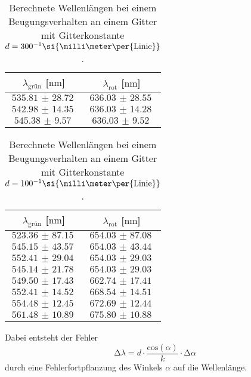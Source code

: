 \begin{table}
    \centering
    \caption{Berechnete Wellenlängen bei einem Beugungsverhalten an einem Gitter mit Gitterkonstante $\protect d = {300^{-1}}\si{\milli\meter\per{\text{Linie}}}$.}
    \label{tab:wave300}
    \begin{tabular}{c c}
        \toprule
        $\lambda_{\text{grün}}$ [$\si{\nano\meter}$] & $\lambda_{\text{rot}}$ [$\si{\nano\meter}$] \\
        \midrule
        $\SI{535.81(2872)}{}$ & $\SI{636.03(2855)}{}$ \\
        $\SI{542.98(1435)}{}$ & $\SI{636.03(1428)}{}$ \\
        $\SI{545.38(957)}{}$ & $\SI{636.03(952)}{}$  \\
        \bottomrule    
    \end{tabular}
\end{table}
\begin{table}
    \centering
    \caption{Berechnete Wellenlängen bei einem Beugungsverhalten an einem Gitter mit Gitterkonstante $\protect d = {100^{-1}}\si{\milli\meter\per{\text{Linie}}}$.}
    \label{tab:wave100}
    \begin{tabular}{c c}
        \toprule
        $\lambda_{\text{grün}}$ [$\si{\nano\meter}$] & $\lambda_{\text{rot}}$ [$\si{\nano\meter}$] \\
        \midrule
        $\SI{523.36(8715)}{}$ & $\SI{654.03(8708)}{}$ \\
        $\SI{545.15(4357)}{}$ & $\SI{654.03(4344)}{}$ \\
        $\SI{552.41(2904)}{}$ & $\SI{654.03(2903)}{}$ \\
        $\SI{545.14(2178)}{}$ & $\SI{654.03(2903)}{}$ \\
        $\SI{549.50(1743)}{}$ & $\SI{662.74(1741)}{}$ \\
        $\SI{552.41(1452)}{}$ & $\SI{668.54(1451)}{}$ \\
        $\SI{554.48(1245)}{}$ & $\SI{672.69(1244)}{}$ \\
        $\SI{561.48(1089)}{}$ & $\SI{675.80(1088)}{}$ \\
        \bottomrule    
    \end{tabular}
\end{table}
\newpage
Dabei entsteht der Fehler 
\begin{equation}
\increment \lambda = d \cdot \frac{\text{cos}(\alpha)}{k} \cdot \increment \alpha
\end{equation}
durch eine Fehlerfortpflanzung des Winkels $\alpha$ auf die Wellenlänge.
